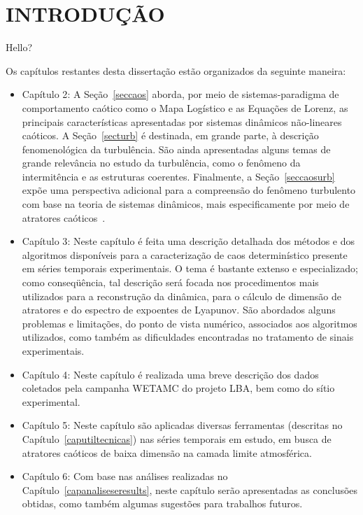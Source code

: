 
\chapter{INTRODUÇÃO}

Hello?

Os capítulos restantes desta dissertação estão organizados da seguinte maneira:
\begin{itemize}
\item{Capítulo 2}: A Seção~\ref{seccaos} aborda, por meio de sistemas-paradigma de comportamento caótico como o Mapa Logístico e as Equações de Lorenz, as principais características apresentadas por sistemas dinâmicos não-lineares caóticos. A Seção~\ref{secturb} é destinada, em grande parte, à descrição fenomenológica da turbulência. São ainda apresentadas alguns temas de grande relevância no estudo da turbulência, como o fenômeno da intermitência e as estruturas coerentes. Finalmente, a Seção~\ref{seccaosurb} expõe uma perspectiva adicional para a compreensão do fenômeno turbulento com base na teoria de sistemas dinâmicos, mais especificamente por meio de atratores caóticos~\cite{ruelltak/71}.
\item{Capítulo 3}: Neste capítulo é feita uma descrição detalhada dos métodos e dos algoritmos disponíveis para a caracterização de caos determinístico presente em séries temporais experimentais. O tema é bastante extenso e especializado; como conseqüência, tal descrição será focada nos procedimentos mais utilizados para a reconstrução da dinâmica, para o cálculo de dimensão de atratores e do espectro de expoentes de Lyapunov. São abordados alguns problemas e limitações, do ponto de vista numérico, associados aos algoritmos utilizados, como também as dificuldades encontradas no tratamento de sinais experimentais.
\item{Capítulo 4}: Neste capítulo é realizada uma breve descrição dos dados coletados pela campanha WETAMC do projeto LBA, bem como do sítio experimental.
\item{Capítulo 5}: Neste capítulo são aplicadas diversas ferramentas (descritas no Capítulo~\ref{caputiltecnicas}) nas séries temporais em estudo, em busca de atratores caóticos de baixa dimensão na camada limite atmosférica.
\item{Capítulo 6}: Com base nas análises realizadas no Capítulo~\ref{capanaliseseresults}, neste capítulo serão apresentadas as conclusões obtidas, como também algumas sugestões para trabalhos futuros.
\end{itemize}

